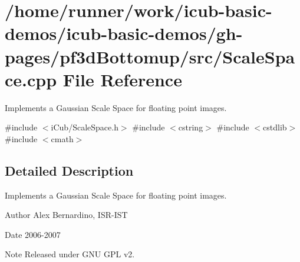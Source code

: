 \section{/home/runner/work/icub-\/basic-\/demos/icub-\/basic-\/demos/gh-\/pages/pf3d\+Bottomup/src/\+Scale\+Space.cpp File Reference}
\label{ScaleSpace_8cpp}


Implements a Gaussian Scale Space for floating point images.  


{\ttfamily \#include $<$i\+Cub/\+Scale\+Space.\+h$>$}\newline
{\ttfamily \#include $<$cstring$>$}\newline
{\ttfamily \#include $<$cstdlib$>$}\newline
{\ttfamily \#include $<$cmath$>$}\newline


\subsection{Detailed Description}
Implements a Gaussian Scale Space for floating point images. 

\begin{DoxyAuthor}{Author}
Alex Bernardino, I\+S\+R-\/\+I\+ST 
\end{DoxyAuthor}
\begin{DoxyDate}{Date}
2006-\/2007 
\end{DoxyDate}
\begin{DoxyNote}{Note}
Released under G\+NU G\+PL v2. 
\end{DoxyNote}
